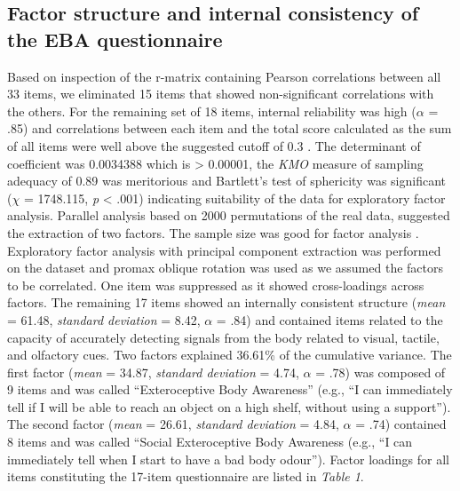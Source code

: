 \documentclass[man]{apa7}
\begin{document}
\subsection{Factor structure and internal consistency of the EBA questionnaire}
Based on inspection of the r-matrix containing Pearson correlations between all 33 items, we eliminated 15 items that showed non-significant correlations with the others. For the remaining set of 18 items, internal reliability was high ($\alpha$ = .85) and correlations between each item and the total score calculated as the sum of all items were well above the suggested cutoff of 0.3 \parencite{streiner2015health}. The determinant of coefficient was 0.0034388 which is > 0.00001, the \emph{KMO} measure of sampling adequacy of 0.89 was meritorious \parencite{kaiser1974little} and Bartlett’s test of sphericity was significant ($\chi$ = 1748.115, \emph{p} < .001) indicating suitability of the data for exploratory factor analysis. Parallel analysis based on 2000 permutations of the real data, suggested the extraction of two factors. The sample size was good for factor analysis \parencite{comrey2013first}. Exploratory factor analysis with principal component extraction was performed on the dataset and promax oblique rotation was used as we assumed the factors to be correlated. One item was suppressed as it showed cross-loadings across factors. The remaining 17 items showed an internally consistent structure (\emph{mean} = 61.48, \emph{standard deviation} = 8.42, $\alpha$ = .84) and contained items related to the capacity of accurately detecting signals from the body related to visual, tactile, and olfactory cues. Two factors explained 36.61\% of the cumulative variance. The first factor (\emph{mean} = 34.87, \emph{standard deviation} = 4.74, $\alpha$ = .78) was composed of 9 items and was called “Exteroceptive Body Awareness” (e.g., “I can immediately tell if I will be able to reach an object on a high shelf, without using a support”).  The second factor (\emph{mean} = 26.61, \emph{standard deviation} = 4.84, $\alpha$ = .74) contained 8 items and was called “Social Exteroceptive Body Awareness (e.g., “I can immediately tell when I start to have a bad body odour”). Factor loadings for all items constituting the 17-item questionnaire are listed in \emph{Table 1}. 
\end{document}

